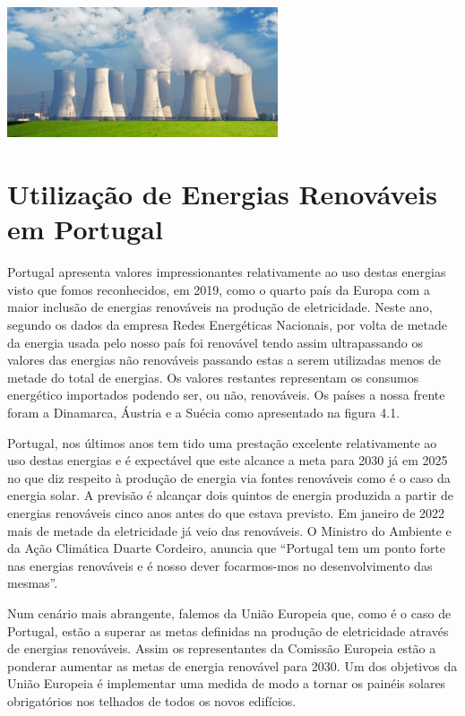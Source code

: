 \documentclass{report}
\begin{document}
\begin{center}
\includegraphics[width=8cm]{energia-nuclear.jpg}
\end{center}


\section{Utilização de Energias Renováveis em Portugal}
Portugal apresenta valores impressionantes relativamente ao uso destas energias visto que fomos reconhecidos, em 2019, como o quarto país da Europa com a maior inclusão de energias renováveis na produção de eletricidade. Neste ano, segundo os dados da empresa Redes Energéticas Nacionais, por volta de metade da energia usada pelo nosso país foi renovável tendo assim ultrapassando os valores das energias não renováveis passando estas a serem utilizadas menos de metade do total de energias. Os valores restantes representam os consumos energético importados podendo ser, ou não, renováveis. Os países a nossa frente foram a Dinamarca, Áustria e a Suécia como apresentado na figura 4.1.



Portugal, nos últimos anos tem tido uma prestação excelente relativamente ao uso destas energias e é expectável que este alcance a meta para 2030 já em 2025 no que diz respeito à produção de energia via fontes renováveis como é o caso da energia solar. A previsão é alcançar dois quintos de energia produzida a partir de energias renováveis cinco anos antes do que estava previsto. Em janeiro de 2022 mais de metade da eletricidade já veio das renováveis. O Ministro do Ambiente e da Ação Climática Duarte Cordeiro, anuncia que “Portugal tem um ponto forte nas energias renováveis e é nosso dever focarmos-mos no desenvolvimento das mesmas”.

Num cenário mais abrangente, falemos da União Europeia que, como é o caso de Portugal, estão a superar as metas definidas na produção de eletricidade através de energias renováveis. Assim os representantes da Comissão Europeia estão a ponderar aumentar as metas de energia renovável para 2030. Um dos objetivos da União Europeia é implementar uma medida de modo a tornar os painéis solares obrigatórios nos telhados de todos os novos edifícios.
\end{document}
